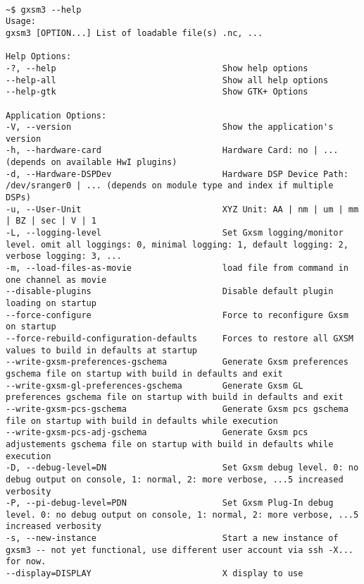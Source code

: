 \\

{\small\begin{verbatim}
~$ gxsm3 --help
Usage:
gxsm3 [OPTION...] List of loadable file(s) .nc, ...

Help Options:
-?, --help                                 Show help options
--help-all                                 Show all help options
--help-gtk                                 Show GTK+ Options

Application Options:
-V, --version                              Show the application's version
-h, --hardware-card                        Hardware Card: no | ... (depends on available HwI plugins)
-d, --Hardware-DSPDev                      Hardware DSP Device Path: /dev/sranger0 | ... (depends on module type and index if multiple DSPs)
-u, --User-Unit                            XYZ Unit: AA | nm | um | mm | BZ | sec | V | 1 
-L, --logging-level                        Set Gxsm logging/monitor level. omit all loggings: 0, minimal logging: 1, default logging: 2, verbose logging: 3, ...
-m, --load-files-as-movie                  load file from command in one channel as movie
--disable-plugins                          Disable default plugin loading on startup
--force-configure                          Force to reconfigure Gxsm on startup
--force-rebuild-configuration-defaults     Forces to restore all GXSM values to build in defaults at startup
--write-gxsm-preferences-gschema           Generate Gxsm preferences gschema file on startup with build in defaults and exit
--write-gxsm-gl-preferences-gschema        Generate Gxsm GL preferences gschema file on startup with build in defaults and exit
--write-gxsm-pcs-gschema                   Generate Gxsm pcs gschema file on startup with build in defaults while execution
--write-gxsm-pcs-adj-gschema               Generate Gxsm pcs adjustements gschema file on startup with build in defaults while execution
-D, --debug-level=DN                       Set Gxsm debug level. 0: no debug output on console, 1: normal, 2: more verbose, ...5 increased verbosity
-P, --pi-debug-level=PDN                   Set Gxsm Plug-In debug level. 0: no debug output on console, 1: normal, 2: more verbose, ...5 increased verbosity
-s, --new-instance                         Start a new instance of gxsm3 -- not yet functional, use different user account via ssh -X... for now.
--display=DISPLAY                          X display to use

\end{verbatim}}

